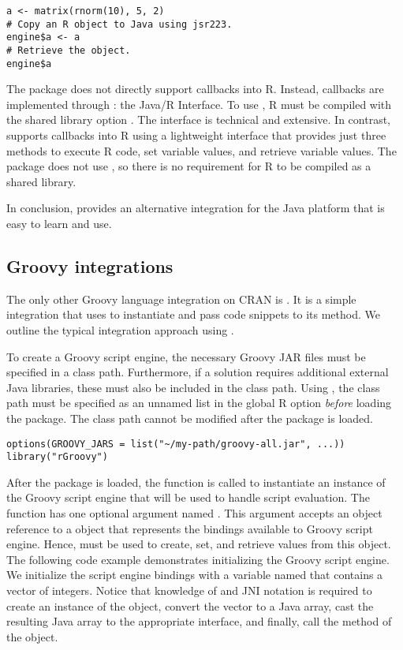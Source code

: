 \begin{verbatim}
a <- matrix(rnorm(10), 5, 2)
# Copy an R object to Java using jsr223.
engine$a <- a
# Retrieve the object.
engine$a
\end{verbatim}

The  package does not directly support callbacks into R. Instead, callbacks are implemented through : the Java/R Interface. To use , R must be compiled with the shared library option . The  interface is technical and extensive. In contrast,  supports callbacks into R using a lightweight interface that provides just three methods to execute R code, set variable values, and retrieve variable values. The  package does not use , so there is no requirement for R to be compiled as a shared library.

In conclusion,  provides an alternative integration for the Java platform that is easy to learn and use.

\subsection{Groovy integrations}

The only other Groovy language integration on CRAN is . It is a simple integration that uses  to instantiate  and pass code snippets to its  method. We outline the typical integration approach using .

To create a Groovy script engine, the necessary Groovy JAR files must be specified in a class path. Furthermore, if a solution requires additional external Java libraries, these must also be included in the class path. Using , the class path must be specified as an unnamed list in the global R option  \textit{before} loading the  package. The class path cannot be modified after the package is loaded.

\begin{verbatim}
options(GROOVY_JARS = list("~/my-path/groovy-all.jar", ...))
library("rGroovy")
\end{verbatim}

After the package is loaded, the  function is called to instantiate an instance of the Groovy script engine that will be used to handle script evaluation. The  function has one optional argument named . This argument accepts an  object reference to a  object that represents the bindings available to Groovy script engine. Hence,  must be used to create, set, and retrieve values from this object. The following code example demonstrates initializing the Groovy script engine. We initialize the script engine bindings with a variable named  that contains a vector of integers. Notice that knowledge of  and JNI notation is required to create an instance of the  object, convert the vector to a Java array, cast the resulting Java array to the appropriate interface, and finally, call the  method of the  object.

